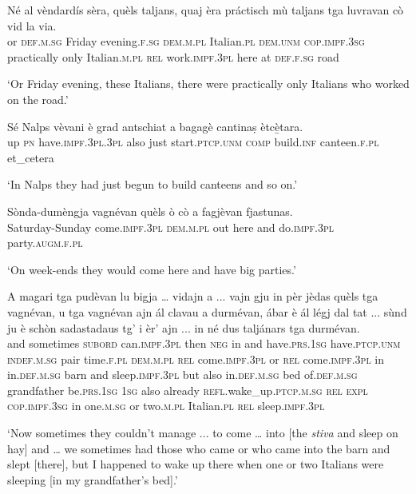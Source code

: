 \begin{linenumbers}
\gll Né al vèndardís sèra, quèls taljans, quaj èra práctisch mù taljans tga luvravan cò vid la via. \\
or \textsc{def.m.sg} Friday evening.\textsc{f.sg} \textsc{dem.m.pl} Italian.\textsc{pl} \textsc{dem.unm} \textsc{cop.impf.3sg}  practically only Italian.\textsc{m.pl} \textsc{rel} work.\textsc{impf.3pl} here at \textsc{def.f.sg} road  \\
\end{linenumbers}
\medskip
\glt `Or Friday evening, these Italians, there were practically only Italians who worked on the road.'
\medskip

\begin{linenumbers}
\gll  Sé Nalps vèvani è grad antschiat a bagagè cantinaṣ ètcè̱tara.\\
up \textsc{pn} have.\textsc{impf.3pl.3pl} also just start.\textsc{ptcp.unm} \textsc{comp} build.\textsc{inf} canteen.\textsc{f.pl} et\_cetera\\
\end{linenumbers}
\medskip
\glt `In Nalps they had just begun to build canteens and so on.'
\medskip

\begin{linenumbers}
\gll Sònda-dumèngja vagnévan quèls ò cò a fagjèvan fjastunas.\\
Saturday-Sunday come.\textsc{impf.3pl} \textsc{dem.m.pl} out here and do.\textsc{impf.3pl} party.\textsc{augm.f.pl}\\
\end{linenumbers}
\medskip
\glt `On week-ends they would come here and have big parties.'
\medskip

\begin{linenumbers}
\gll A  magari tga pudèvan lu bigja … vidajn a ... vajn gju in pèr jèdas quèls tga vagnévan, u tga vagnévan ajn ál clavau a durmévan, ábar è ál légj dal tat ... sùnd ju è schòn sadastadaus tg' i èr' ajn ... in né dus taljánars tga durmévan.\\
and sometimes  \textsc{subord} can.\textsc{impf.3pl} then \textsc{neg} {} in and {} have.\textsc{prs.1sg} have.\textsc{ptcp.unm} \textsc{indef.m.sg} pair  time.\textsc{f.pl} \textsc{dem.m.pl} \textsc{rel} come.\textsc{impf.3pl} or \textsc{rel} come.\textsc{impf.3pl} in in.\textsc{def.m.sg} barn and sleep.\textsc{impf.3pl} but also in.\textsc{def.m.sg} bed of.\textsc{def.m.sg} grandfather {} be.\textsc{prs.1sg} \textsc{1sg} also already \textsc{refl.}wake\_up.\textsc{ptcp.m.sg} \textsc{rel} \textsc{expl} \textsc{cop.impf.3sg} in {} one.\textsc{m.sg} or two.\textsc{m.pl} Italian.\textsc{pl} \textsc{rel} sleep.\textsc{impf.3pl}  \\
\end{linenumbers}
\medskip
\glt `Now sometimes they couldn’t manage ... to come … into [the \textit{stiva} and sleep on hay] and … we sometimes had those who came or who came into the barn and slept [there], but I happened to wake up there when one or two Italians were sleeping [in my grandfather’s bed].'
\medskip

